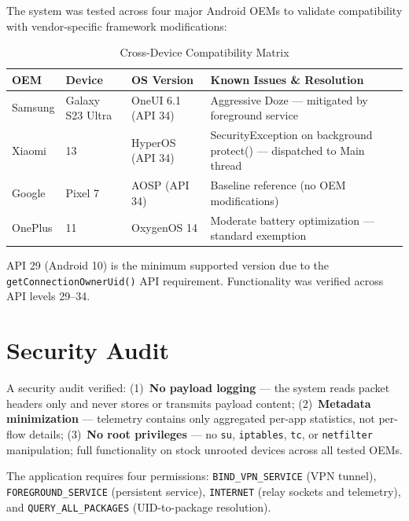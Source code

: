 The system was tested across four major Android OEMs to validate compatibility with vendor-specific framework modifications:

\begin{table}[H]
\centering
\caption{Cross-Device Compatibility Matrix}
\label{tab:compatibility_matrix}
\begin{tabularx}{\textwidth}{l l l X}
\toprule
\textbf{OEM} & \textbf{Device} & \textbf{OS Version} & \textbf{Known Issues \& Resolution} \\
\midrule
Samsung  & Galaxy S23 Ultra & OneUI 6.1 (API 34) & Aggressive Doze --- mitigated by foreground service \\
Xiaomi   & 13               & HyperOS (API 34)   & SecurityException on background protect() --- dispatched to Main thread \\
Google   & Pixel 7           & AOSP (API 34)      & Baseline reference (no OEM modifications) \\
OnePlus  & 11                & OxygenOS 14        & Moderate battery optimization --- standard exemption \\
\bottomrule
\end{tabularx}
\end{table}

API 29 (Android 10) is the minimum supported version due to the \texttt{getConnectionOwnerUid()} API requirement. Functionality was verified across API levels 29--34.

\section{Security Audit}
\label{sec:security_testing}

A security audit verified: (1)~\textbf{No payload logging} --- the system reads packet headers only and never stores or transmits payload content; (2)~\textbf{Metadata minimization} --- telemetry contains only aggregated per-app statistics, not per-flow details; (3)~\textbf{No root privileges} --- no \texttt{su}, \texttt{iptables}, \texttt{tc}, or \texttt{netfilter} manipulation; full functionality on stock unrooted devices across all tested OEMs.

The application requires four permissions: \texttt{BIND\_VPN\_SERVICE} (VPN tunnel), \texttt{FOREGROUND\_SERVICE} (persistent service), \texttt{INTERNET} (relay sockets and telemetry), and \texttt{QUERY\_ALL\_PACKAGES} (UID-to-package resolution).

